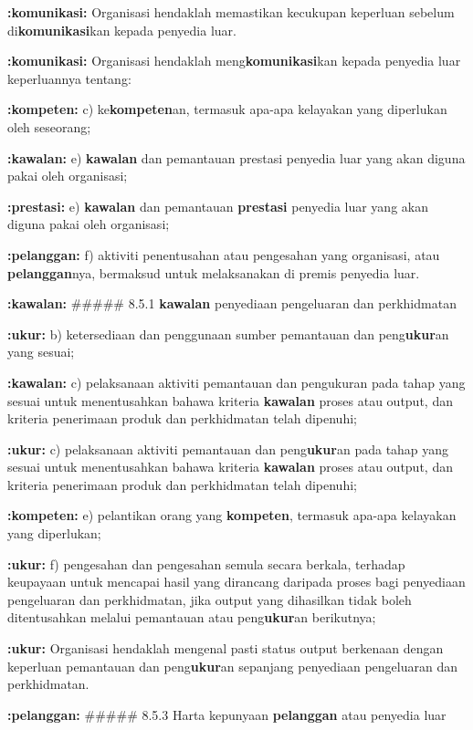 \documentclass{article}
\begin{document}
\textbf{:komunikasi:} Organisasi hendaklah memastikan kecukupan keperluan sebelum di\textbf{komunikasi}kan kepada
penyedia luar.

\textbf{:komunikasi:} Organisasi hendaklah meng\textbf{komunikasi}kan kepada penyedia luar keperluannya tentang:

\textbf{:kompeten:} c) ke\textbf{kompeten}an, termasuk apa-apa kelayakan yang diperlukan oleh seseorang;

\textbf{:kawalan:} e) \textbf{kawalan} dan pemantauan prestasi penyedia luar yang akan diguna pakai oleh organisasi;

\textbf{:prestasi:} e) \textbf{kawalan} dan pemantauan \textbf{prestasi} penyedia luar yang akan diguna pakai oleh organisasi;

\textbf{:pelanggan:} f) aktiviti penentusahan atau pengesahan yang organisasi, atau \textbf{pelanggan}nya, bermaksud
untuk melaksanakan di premis penyedia luar.

\textbf{:kawalan:} \#\#\#\#\# 8.5.1 \textbf{kawalan} penyediaan pengeluaran dan perkhidmatan

\textbf{:ukur:} b) ketersediaan dan penggunaan sumber pemantauan dan peng\textbf{ukur}an yang sesuai;

\textbf{:kawalan:} c) pelaksanaan aktiviti pemantauan dan pengukuran pada tahap yang sesuai untuk
menentusahkan bahawa kriteria \textbf{kawalan} proses atau output, dan kriteria penerimaan
produk dan perkhidmatan telah dipenuhi;

\textbf{:ukur:} c) pelaksanaan aktiviti pemantauan dan peng\textbf{ukur}an pada tahap yang sesuai untuk
menentusahkan bahawa kriteria \textbf{kawalan} proses atau output, dan kriteria penerimaan
produk dan perkhidmatan telah dipenuhi;

\textbf{:kompeten:} e) pelantikan orang yang \textbf{kompeten}, termasuk apa-apa kelayakan yang diperlukan;

\textbf{:ukur:} f) pengesahan dan pengesahan semula secara berkala, terhadap keupayaan untuk
mencapai hasil yang dirancang daripada proses bagi penyediaan pengeluaran dan
perkhidmatan, jika output yang dihasilkan tidak boleh ditentusahkan melalui pemantauan
atau peng\textbf{ukur}an berikutnya;

\textbf{:ukur:} Organisasi hendaklah mengenal pasti status output berkenaan dengan keperluan
pemantauan dan peng\textbf{ukur}an sepanjang penyediaan pengeluaran dan perkhidmatan.

\textbf{:pelanggan:} \#\#\#\#\# 8.5.3 Harta kepunyaan \textbf{pelanggan} atau penyedia luar
\end{document}
